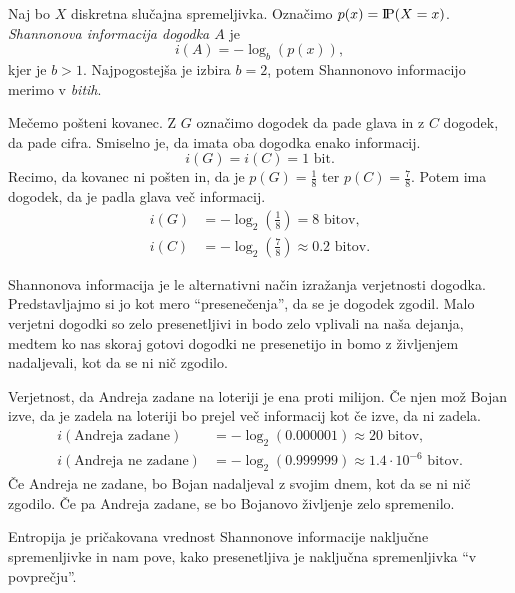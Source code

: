 \documentclass[fin1, tisk]{fmfdelo}
\newcommand{\probP}{\text{I\kern-0.15em P}}
\theoremstyle{definition}
\begin{document}
\begin{definicija}
    Naj bo $X$ diskretna slučajna spremeljivka. Označimo $p(x) = \probP(X = x)$. 
    \emph{Shannonova informacija dogodka $A$} je
    \[
        i(A) = - \log_b(p(x)),
    \]
    kjer je $b > 1$. Najpogostejša je izbira $b=2$, potem Shannonovo informacijo merimo v 
    \emph{bitih}. 
\end{definicija}

\begin{primer}
    Mečemo pošteni kovanec. Z $G$ označimo dogodek da pade glava in z $C$ dogodek, da pade cifra.
    Smiselno je, da imata oba dogodka enako informacij.
    \[
        i(G) = i(C) = 1 \text{ bit}.
    \]
    Recimo, da kovanec ni pošten in, da je $p(G) = \frac{1}{8}$ ter $p(C) = \frac{7}{8}$.
    Potem ima dogodek, da je padla glava več informacij.
    \begin{align*}
        i(G) &= - \log_2 \left( \frac{1}{8} \right) = 8 \text{ bitov}, \\
        i(C) &= - \log_2 \left( \frac{7}{8} \right) \approx 0.2 \text{ bitov}.
    \end{align*}
\end{primer} 

Shannonova informacija je le alternativni način izražanja verjetnosti dogodka. Predstavljajmo si 
jo kot mero ``presenečenja'', da se je dogodek zgodil. Malo verjetni dogodki so zelo presenetljivi
in bodo zelo vplivali na naša dejanja, medtem ko nas skoraj gotovi dogodki ne presenetijo in bomo
z življenjem nadaljevali, kot da se ni nič zgodilo.

\begin{primer}
    Verjetnost, da Andreja zadane na loteriji je ena proti milijon. Če njen mož Bojan izve, da je
    zadela na loteriji bo prejel več informacij kot če izve, da ni zadela.
    \begin{align*}
        i(\text{Andreja zadane}) &= - \log_2 (0.000001) \approx 20 \text{ bitov}, \\
        i(\text{Andreja ne zadane}) &= - \log_2 (0.999999) \approx 1.4 \cdot 10^{-6} \text{ bitov}.
    \end{align*}
    Če Andreja ne zadane, bo Bojan nadaljeval z svojim dnem, kot da se ni nič zgodilo. Če pa 
    Andreja zadane, se bo Bojanovo življenje zelo spremenilo.
\end{primer}

Entropija je pričakovana vrednost Shannonove informacije naključne spremenljivke in nam pove,
kako presenetljiva je naključna spremenljivka ``v povprečju''.
\end{document}
